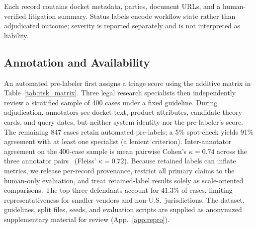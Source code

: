 Each record contains docket metadata, parties, document URLs, and a human-verified litigation summary. Status labels encode workflow state rather than adjudicated outcome; severity is reported separately and is not interpreted as liability.

\subsection{Annotation and Availability}
An automated pre-labeler first assigns a triage score using the additive matrix in Table~\ref{tab:risk_matrix}. Three legal research specialists then independently review a stratified sample of 400 cases under a fixed guideline. During adjudication, annotators see docket text, product attributes, candidate theory cards, and query dates, but neither system identity nor the pre-labeler's score. The remaining 847 cases retain automated pre-labels; a 5\% spot-check yields 91\% agreement with at least one specialist (a lenient criterion). Inter-annotator agreement on the 400-case sample is mean pairwise Cohen's $\kappa=0.74$ across the three annotator pairs~\citep{landis1977kappa} (Fleiss' $\kappa=0.72$). Because retained labels can inflate metrics, we release per-record provenance, restrict all primary claims to the human-only evaluation, and treat retained-label results solely as scale-oriented comparisons. The top three defendants account for 41.3\% of cases, limiting representativeness for smaller vendors and non-U.S.\ jurisdictions. The dataset, guidelines, split files, seeds, and evaluation scripts are supplied as anonymized supplementary material for review (App.~\ref{app:repro}).
